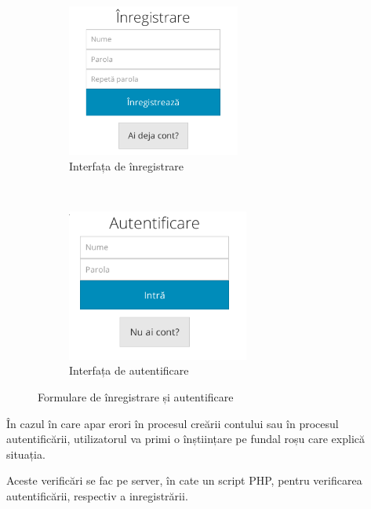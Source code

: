 \documentclass[12pt,a4paper]{article}
\begin{document}
\begin{figure}[h!]
        \centering
        \begin{subfigure}[b]{0.45\textwidth}
                \includegraphics[height=5cm]{img/inreg.png}
                \caption{Interfața de înregistrare}
        \end{subfigure}%
        ~ \qquad 
        \begin{subfigure}[b]{0.45\textwidth}
                \includegraphics[height=5cm]{img/auth.png}
                \caption{Interfața de autentificare}
        \end{subfigure}
        \caption{Formulare de înregistrare și autentificare}%
\end{figure}

 

În cazul  în care apar erori în procesul creării contului sau în procesul autentificării,
utilizatorul va primi o înștiințare pe fundal roșu care explică situația.

Aceste verificări se fac pe server,  în cate un script PHP, pentru verificarea autentificării, respectiv a inregistrării. 
\end{document}
